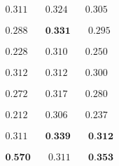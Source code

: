 \newsavebox\pcpSF
\begin{lrbox}{\pcpSF}
   $\begin{aligned}
     0.311 & \quad 0.324 & \quad 0.305
    \end{aligned} $
\end{lrbox}

\newsavebox\pcpFoote
\begin{lrbox}{\pcpFoote}
   $\begin{aligned}
     0.288 & \quad \textbf{0.331} & \quad 0.295
    \end{aligned} $
\end{lrbox}

\newsavebox\pcpCNMF
\begin{lrbox}{\pcpCNMF}
   $\begin{aligned}
     0.228 & \quad 0.310 & \quad 0.250
    \end{aligned} $
\end{lrbox}

\newsavebox\tonnetzSF
\begin{lrbox}{\tonnetzSF}
   $\begin{aligned}
     0.312 & \quad 0.312 & \quad 0.300
    \end{aligned} $
\end{lrbox}

\newsavebox\tonnetzFoote
\begin{lrbox}{\tonnetzFoote}
   $\begin{aligned}
     0.272 & \quad 0.317 & \quad 0.280
    \end{aligned} $
\end{lrbox}

\newsavebox\tonnetzCNMF
\begin{lrbox}{\tonnetzCNMF}
   $\begin{aligned}
     0.212 & \quad 0.306 & \quad 0.237
    \end{aligned} $
\end{lrbox}

\newsavebox\cqtSF
\begin{lrbox}{\cqtSF}
   $\begin{aligned}
     0.311 & \quad \textbf{0.339} & \quad \textbf{0.312}
    \end{aligned} $
\end{lrbox}

\newsavebox\cqtFoote
\begin{lrbox}{\cqtFoote}
   $\begin{aligned}
     \textbf{0.570} & \quad 0.311 & \quad \textbf{0.353}
    \end{aligned} $
\end{lrbox}

